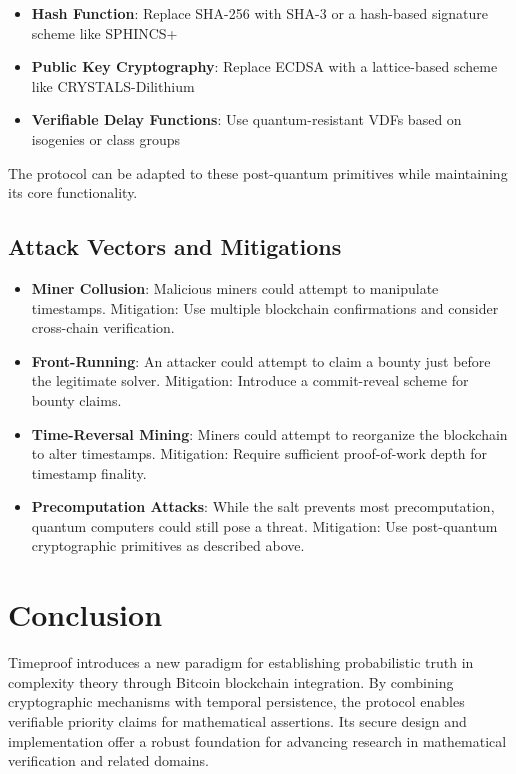 \documentclass[12pt]{report}
\begin{document}
\begin{itemize}
    \item \textbf{Hash Function}: Replace SHA-256 with SHA-3 or a hash-based signature scheme like SPHINCS+
    \item \textbf{Public Key Cryptography}: Replace ECDSA with a lattice-based scheme like CRYSTALS-Dilithium
    \item \textbf{Verifiable Delay Functions}: Use quantum-resistant VDFs based on isogenies or class groups
\end{itemize}

The protocol can be adapted to these post-quantum primitives while maintaining its core functionality.

\subsection{Attack Vectors and Mitigations}
\begin{itemize}
    \item \textbf{Miner Collusion}: Malicious miners could attempt to manipulate timestamps. Mitigation: Use multiple blockchain confirmations and consider cross-chain verification.
    \item \textbf{Front-Running}: An attacker could attempt to claim a bounty just before the legitimate solver. Mitigation: Introduce a commit-reveal scheme for bounty claims.
    \item \textbf{Time-Reversal Mining}: Miners could attempt to reorganize the blockchain to alter timestamps. Mitigation: Require sufficient proof-of-work depth for timestamp finality.
    \item \textbf{Precomputation Attacks}: While the salt prevents most precomputation, quantum computers could still pose a threat. Mitigation: Use post-quantum cryptographic primitives as described above.
\end{itemize}

\section{Conclusion}

Timeproof introduces a new paradigm for establishing probabilistic truth in complexity theory through Bitcoin blockchain integration. By combining cryptographic mechanisms with temporal persistence, the protocol enables verifiable priority claims for mathematical assertions. Its secure design and implementation offer a robust foundation for advancing research in mathematical verification and related domains.
\end{document}
